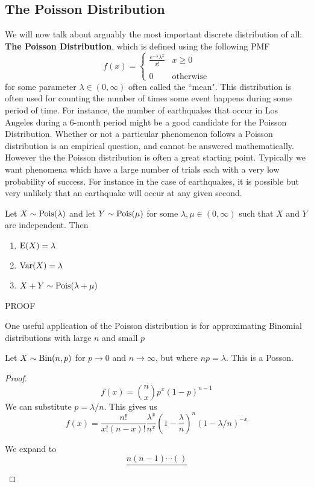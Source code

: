 \subsection{The Poisson Distribution}
\newcommand{\pois}{\textup{Pois}}
We will now talk about arguably the most important discrete distribution of all: \textbf{The Poisson Distribution}, which is defined using the following PMF
\[
    f(x)=\begin{cases}
        \displaystyle\frac{e^{-\lambda }\lambda^x}{x!} & x\ge 0
        \\\\
        0 & \text{otherwise}
    \end{cases}
\]
for some parameter $\lambda\in(0,\infty)$ often called the ``mean". This distribution is often used for counting the number of times some event happens during some period of time. For instance, the number of earthquakes that occur in Los Angeles during a 6-month period might be a good candidate for the Poisson Distribution. Whether or not a particular phenomenon follows a Poisson distribution is an empirical question, and cannot be answered mathematically. However the the Poisson distribution is often a great starting point. Typically we want phenomena which have a large number of trials each with a very low probability of success. For instance in the case of earthquakes, it is possible but very unlikely that an earthquake will occur at any given second.
\begin{theorem}
    Let $X\sim\pois(\lambda)$ and let $Y\sim\pois(\mu)$ for some $\lambda,\mu\in(0,\infty)$ such that $X$ and $Y$ are independent. Then
    \begin{enumerate}
        \item $\textup{E}(X)=\lambda$
        \item $\textup{Var}(X)=\lambda$
        \item $X+Y\sim\pois(\lambda+\mu)$
    \end{enumerate}
    \todo PROOF
\end{theorem}

One useful application of the Poisson distribution is for approximating Binomial distributions with large $n$ and small $p$


\begin{lemma}
    Let $X\sim\textup{Bin}(n,p)$ for $p\to 0$ and $n\to \infty$, but where $np=\lambda$. This is a Posson.
    \todo
    \begin{proof}
    
    
        \[
            f(x)=\binom nx p^x(1-p)^{n-1}
        \]
        We can substitute $p=\lambda/n$. This gives us
        \[
            f(x)=\frac{n!}{x!(n-x)!} \frac{\lambda^x}{n^x}(1-\frac \lambda n)^n (1-\lambda /n)^{-x}
        \]

        We expand to
        \[
            \frac{n(n-1)\cdots()}{}
        \]
    \end{proof}
\end{lemma}

